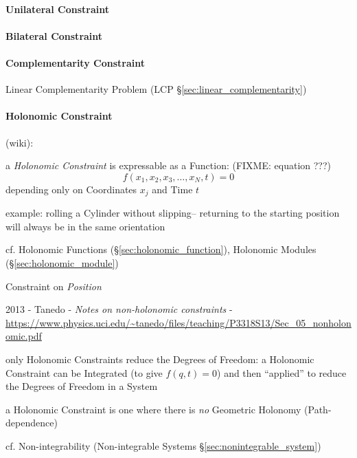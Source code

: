 \paragraph{Unilateral Constraint}\label{sec:unilateral_constraint}\hfill

\paragraph{Bilateral Constraint}\label{sec:bilateral_constraint}\hfill

\paragraph{Complementarity Constraint}
\label{sec:complementarity_constraint}\hfill

\fist Linear Complementarity Problem (LCP \S\ref{sec:linear_complementarity})



\paragraph{Holonomic Constraint}\label{sec:holonomic_constraint}\hfill

(wiki):

a \emph{Holonomic Constraint} is expressable as a Function: (FIXME: equation
???)
\[
  f(x_1, x_2, x_3, \ldots, x_N, t) = 0
\]
depending only on Coordinates $x_j$ and Time $t$

example: rolling a Cylinder without slipping-- returning to the starting
position will always be in the same orientation

\fist cf. Holonomic Functions (\S\ref{sec:holonomic_function}), Holonomic
Modules (\S\ref{sec:holonomic_module})

Constraint on \emph{Position}

\asterism

2013 - Tanedo - \emph{Notes on non-holonomic constraints} -
\url{https://www.physics.uci.edu/~tanedo/files/teaching/P3318S13/Sec_05_nonholonomic.pdf}

only Holonomic Constraints reduce the Degrees of Freedom: a Holonomic
Constraint can be Integrated (to give $f(q, t) = 0$) and then ``applied'' to
reduce the Degrees of Freedom in a System

a Holonomic Constraint is one where there is \emph{no} Geometric Holonomy
(Path-dependence)

cf. Non-integrability (Non-integrable Systems \S\ref{sec:nonintegrable_system})

